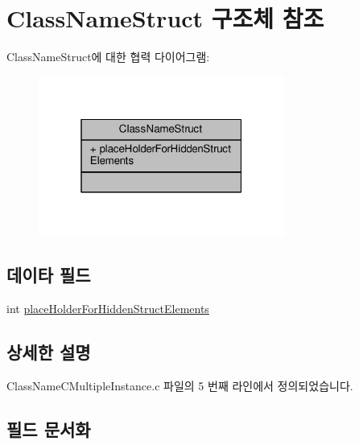 \hypertarget{struct_class_name_struct}{}\section{Class\+Name\+Struct 구조체 참조}
\label{struct_class_name_struct}


Class\+Name\+Struct에 대한 협력 다이어그램\+:
\nopagebreak
\begin{figure}[H]
\begin{center}
\leavevmode
\includegraphics[width=229pt]{struct_class_name_struct__coll__graph}
\end{center}
\end{figure}
\subsection*{데이타 필드}
\begin{DoxyCompactItemize}
\item 
int \hyperlink{struct_class_name_struct_a5705d42d83aa1408a1f19b218cd11502}{place\+Holder\+For\+Hidden\+Struct\+Elements}
\end{DoxyCompactItemize}


\subsection{상세한 설명}


Class\+Name\+C\+Multiple\+Instance.\+c 파일의 5 번째 라인에서 정의되었습니다.



\subsection{필드 문서화}
